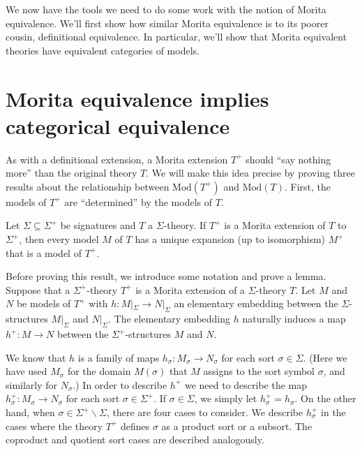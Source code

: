   We now have the tools we need to do some work with the notion of
  Morita equivalence.  We'll first show how similar Morita equivalence
  is to its poorer cousin, definitional equivalence.  In particular,
  we'll show that Morita equivalent theories have equivalent
  categories of models.

\section{Morita equivalence implies categorical equivalence} \label{sec:moca}

As with a definitional extension, a Morita extension $T^+$ should
``say nothing more'' than the original theory $T$.  We will make this
idea precise by proving three results about the relationship between
$\mathrm{Mod}(T^+)$ and $\mathrm{Mod}(T)$.  First, the models of $T^+$
are ``determined'' by the models of $T$.

\begin{thm}[Barrett] Let $\Sigma\subseteq\Sigma^+$ be signatures and
  $T$ a $\Sigma$-theory. If $T^+$ is a Morita extension of $T$ to
  $\Sigma^+$, then every model $M$ of $T$ has a unique expansion (up
  to isomorphism) $M^+$ that is a model of $T^+$. \label{mor1}
\end{thm}

Before proving this result, we introduce some notation and prove a
lemma.  Suppose that a $\Sigma^+$-theory $T^+$ is a Morita extension
of a $\Sigma$-theory $T$. Let $M$ and $N$ be models of $T^+$ with
$h:M|_\Sigma\rightarrow N|_\Sigma$ an elementary embedding between the
$\Sigma$-structures $M|_\Sigma$ and $N|_\Sigma$. The elementary
embedding $h$ naturally induces a map $h^+:M\rightarrow N$ between the
$\Sigma^+$-structures $M$ and $N$.

We know that $h$ is a family of maps
$h_\sigma: M_\sigma\rightarrow N_\sigma$ for each sort
$\sigma\in\Sigma$.  (Here we have used $M_\sigma$ for the domain
$M(\sigma )$ that $M$ assigns to the sort symbol $\sigma$, and
similarly for $N_\sigma$.)  In order to describe $h^+$ we need to
describe the map $h^+_\sigma:M_\sigma\rightarrow N_\sigma$ for each
sort $\sigma\in\Sigma^+$. If $\sigma\in\Sigma$, we simply let
$h_\sigma^+=h_\sigma$.  On the other hand, when
$\sigma\in\Sigma^+\backslash\Sigma$, there are four cases to consider.
We describe $h^+_\sigma$ in the cases where the theory $T^+$ defines
$\sigma$ as a product sort or a subsort. The coproduct and quotient
sort cases are described analogously.

